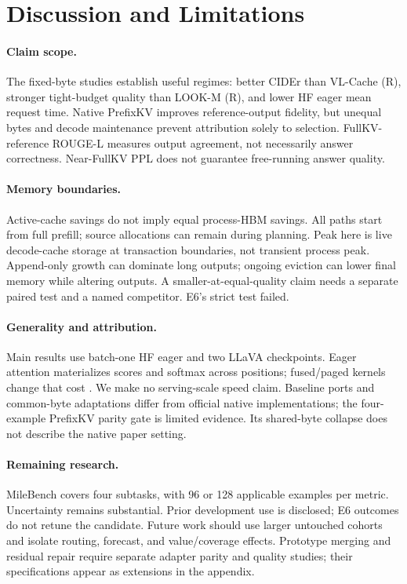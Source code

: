 \section{Discussion and Limitations}
\label{sec:discussion}
\paragraph{Claim scope.}
The fixed-byte studies establish useful regimes: better CIDEr than VL-Cache
(R), stronger tight-budget quality than LOOK-M (R), and lower HF eager mean
request time. Native PrefixKV improves reference-output fidelity, but unequal
bytes and decode maintenance prevent attribution solely to selection.
FullKV-reference ROUGE-L measures output agreement, not necessarily answer
correctness. Near-FullKV PPL does not guarantee free-running answer quality.

\paragraph{Memory boundaries.}
Active-cache savings do not imply equal process-HBM savings. All paths start
from full prefill; source allocations can remain during planning. Peak here
is live decode-cache storage at transaction boundaries, not transient process
peak. Append-only growth can dominate long outputs; ongoing eviction can
lower final memory while altering outputs. A smaller-at-equal-quality claim
needs a separate paired test and a named competitor. E6's strict test failed.

\paragraph{Generality and attribution.}
Main results use batch-one HF eager and two LLaVA checkpoints. Eager attention
materializes scores and softmax across positions; fused/paged kernels change
that cost \citep{dao2022flash,dao2023flash2,kwon2023paged}. We make no
serving-scale speed claim. Baseline ports and common-byte adaptations differ
from official native implementations; the four-example PrefixKV parity gate
is limited evidence. Its shared-byte collapse does not describe the native
paper setting.

\paragraph{Remaining research.}
MileBench covers four subtasks, with 96 or 128 applicable examples per metric.
Uncertainty remains substantial. Prior development use is disclosed; E6
outcomes do not retune the candidate. Future work should use larger untouched
cohorts and isolate routing, forecast, and value/coverage effects.
Prototype merging and residual repair require separate adapter parity and
quality studies; their specifications appear as extensions in the appendix.
